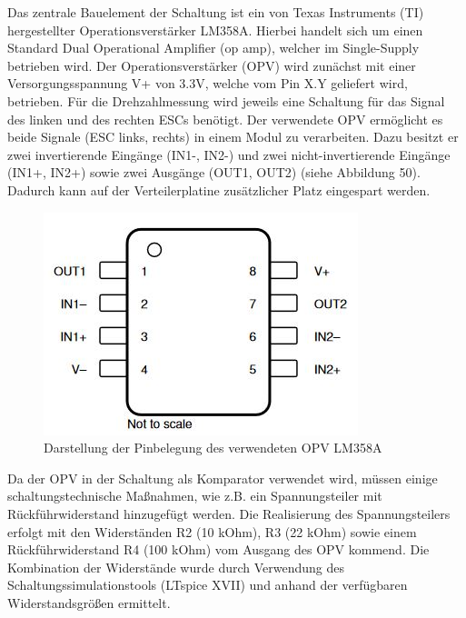 Das zentrale Bauelement der Schaltung ist ein von Texas Instruments (TI) hergestellter Operationsverstärker LM358A. Hierbei handelt sich um einen Standard Dual Operational Amplifier (op amp), welcher im Single-Supply betrieben wird. Der Operationsverstärker (OPV) wird zunächst mit einer Versorgungsspannung V+ von 3.3V, welche vom Pin X.Y geliefert wird, betrieben. Für die Drehzahlmessung wird jeweils eine Schaltung für das Signal des linken und des rechten ESCs benötigt. Der verwendete OPV ermöglicht es beide Signale (ESC links, rechts) in einem Modul zu verarbeiten. Dazu besitzt er zwei invertierende Eingänge (IN1-, IN2-) und zwei nicht-invertierende Eingänge (IN1+, IN2+) sowie zwei Ausgänge (OUT1, OUT2) (siehe Abbildung 50). Dadurch kann auf der Verteilerplatine zusätzlicher Platz eingespart werden.

\begin{figure}[H] %
\includegraphics[width=.50\textwidth]{sec4/images/OPV_Pinbelegung} 
\centering
\captionsetup{width=.95\textwidth}
\caption[OPV\_Pinbelegung]{Darstellung der Pinbelegung des verwendeten OPV LM358A}\centering
\label{fig:Schaltungsaufbau}
\end{figure}


Da der OPV in der Schaltung als Komparator verwendet wird, müssen einige schaltungstechnische Maßnahmen, wie z.B. ein Spannungsteiler mit Rückführwiderstand hinzugefügt werden. Die Realisierung des Spannungsteilers erfolgt mit den Widerständen R2 (10 kOhm), R3 (22 kOhm) sowie einem Rückführwiderstand R4 (100 kOhm) vom Ausgang des OPV kommend. Die Kombination der Widerstände wurde durch Verwendung des Schaltungssimulationstools (LTspice XVII) und anhand der verfügbaren Widerstandsgrößen ermittelt.\vspace{11pt}

